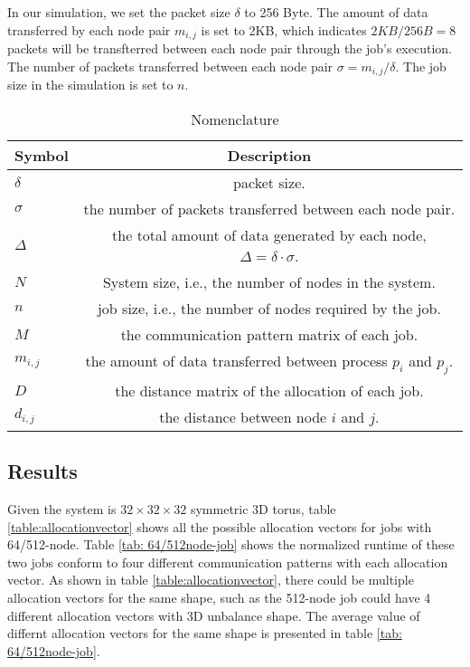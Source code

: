 \documentclass[conference]{IEEEtran}
\begin{document}
In our simulation, we set the packet size $\delta$ to 256 Byte. The amount of data transferred by each node pair $m_{i,j}$ is set to 2KB, which indicates $2KB/256B = 8$ packets will be transfterred between each node pair through the job's execution. The number of packets transferred between each node pair $\sigma = m_{i,j}/\delta$. The job size in the simulation is set to $n$.

\begin{table}
\caption{Nomenclature}
\label{table:nomenclature}
\begin{center}
  \begin{tabular}{ l | c }
    \hline \hline
    Symbol 	& Description \\ \hline \hline
    $\delta$ 	& packet size. \\ \hline
    $\sigma$    & the number of packets transferred between each node pair. \\ \hline
    $\Delta$    & the total amount of data generated by each node, $\Delta = \delta \cdot \sigma$. \\ \hline
    $N $   	& System size, i.e., the number of nodes in the system.\\ \hline
    $n$    & job size, i.e., the number of nodes required by the job.\\ \hline
    $M$    & the communication pattern matrix of each job.\\ \hline
    $m_{i,j}$ 	& the amount of data transferred between process $p_i$ and $p_j$. \\ \hline
    $D$    & the distance matrix of the allocation of each job. \\ \hline
    $d_{i,j}$    & the distance between node $i$ and $j$. \\ \hline
    \hline
  \end{tabular}
\end{center}
\end{table}

\subsection{Results}
\label{sec:results}
Given the system is $32\times 32 \times 32$ symmetric 3D torus, table \ref{table:allocationvector} shows all the possible allocation vectors for jobs with 64/512-node. Table \ref{tab: 64/512node-job} shows the normalized runtime of these two jobs conform to four different communication patterns with each allocation vector. As shown in table \ref{table:allocationvector}, there could be multiple allocation vectors for the same shape, such as the 512-node job could have 4 different allocation vectors with 3D unbalance shape. The average value of differnt allocation vectors for the same shape is presented in table \ref{tab: 64/512node-job}.
\end{document}
